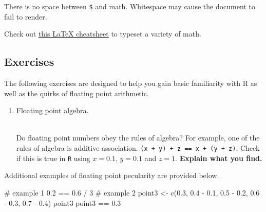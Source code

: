 \documentclass[
  letterpaper,
  DIV=11,
  numbers=noendperiod]{scrartcl}
\newenvironment{Shaded}{\begin{snugshade}}{\end{snugshade}}
\newcommand{\CommentTok}[1]{\textcolor[rgb]{0.37,0.37,0.37}{#1}}
\newcommand{\DecValTok}[1]{\textcolor[rgb]{0.68,0.00,0.00}{#1}}
\newcommand{\FloatTok}[1]{\textcolor[rgb]{0.68,0.00,0.00}{#1}}
\newcommand{\FunctionTok}[1]{\textcolor[rgb]{0.28,0.35,0.67}{#1}}
\newcommand{\NormalTok}[1]{\textcolor[rgb]{0.00,0.23,0.31}{#1}}
\newcommand{\OtherTok}[1]{\textcolor[rgb]{0.00,0.23,0.31}{#1}}
\newcommand{\SpecialCharTok}[1]{\textcolor[rgb]{0.37,0.37,0.37}{#1}}
\providecommand{\tightlist}{%
  \setlength{\itemsep}{0pt}\setlength{\parskip}{0pt}}\usepackage{longtable,booktabs,array}
\begin{document}
\begin{tcolorbox}[enhanced jigsaw, titlerule=0mm, opacityback=0, breakable, bottomtitle=1mm, bottomrule=.15mm, toptitle=1mm, colbacktitle=quarto-callout-note-color!10!white, left=2mm, arc=.35mm, coltitle=black, toprule=.15mm, colframe=quarto-callout-note-color-frame, opacitybacktitle=0.6, rightrule=.15mm, title=\textcolor{quarto-callout-note-color}{\faInfo}\hspace{0.5em}{Note}, leftrule=.75mm, colback=white]
There is no space between \texttt{\$} and math. Whitespace may cause the
document to fail to render.
\end{tcolorbox}

Check out
\href{http://tug.ctan.org/info/undergradmath/undergradmath.pdf}{this
LaTeX cheatsheet} to typeset a variety of math.

\hypertarget{exercises}{%
\subsection{Exercises}\label{exercises}}

The following exercises are designed to help you gain basic familiarity
with R as well as the quirks of floating point arithmetic.

\begin{enumerate}
\def\labelenumi{\arabic{enumi}.}
\tightlist
\item
  Floating point algebra.\\
  \strut \\
  Do floating point numbers obey the rules of algebra? For example, one
  of the rules of algebra is additive association.
  \texttt{(x\ +\ y)\ +\ z\ ==\ x\ +\ (y\ +\ z)}. Check if this is true
  in \texttt{R} using \(x = 0.1\), \(y = 0.1\) and \(z = 1\).
  \textbf{Explain what you find.}
\end{enumerate}

Additional examples of floating point pecularity are provided below.

\begin{Shaded}
\begin{Highlighting}[]
\CommentTok{\# example 1}
\FloatTok{0.2} \SpecialCharTok{==} \FloatTok{0.6} \SpecialCharTok{/} \DecValTok{3}
\CommentTok{\# example 2}
\NormalTok{point3 }\OtherTok{\textless{}{-}} \FunctionTok{c}\NormalTok{(}\FloatTok{0.3}\NormalTok{, }\FloatTok{0.4} \SpecialCharTok{{-}} \FloatTok{0.1}\NormalTok{, }\FloatTok{0.5} \SpecialCharTok{{-}} \FloatTok{0.2}\NormalTok{, }\FloatTok{0.6} \SpecialCharTok{{-}} \FloatTok{0.3}\NormalTok{, }\FloatTok{0.7} \SpecialCharTok{{-}} \FloatTok{0.4}\NormalTok{)}
\NormalTok{point3}
\NormalTok{point3 }\SpecialCharTok{==} \FloatTok{0.3}
\end{Highlighting}
\end{Shaded}
\end{document}
